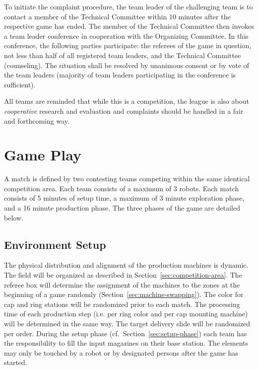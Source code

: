 \documentclass[12pt,twoside]{article}
\newcommand{\refsec}[1]{Section~\ref{#1}}
\begin{document}
To initiate the complaint procedure, the team leader of the
challenging team is to contact a member of the Technical Committee
within 10 minutes after the respective game has ended. The member of
the Technical Committee then invokes a team leader conference in
cooperation with the Organizing Committee. In this conference, the
following parties participate: the referees of the game in question,
not less than half of all registered team leaders, and the Technical
Committee (counseling). The situation shall be resolved by unanimous
consent or by vote of the team leaders (majority of team leaders
participating in the conference is sufficient).

All teams are reminded that while this is a competition, the league is
also about \emph{cooperative} research and evaluation and complaints
should be handled in a fair and forthcoming way.

\section{Game Play}
A match is defined by two contesting teams competing within the same
identical competition area. Each team consists of a maximum of 3
robots. Each match consists of 5 minutes of setup time, a maximum of 3
minute exploration phase, and a 16 minute production phase.
The three phases of the game are detailed below.

\subsection{Environment Setup}
\label{sec:env-setup}
The physical distribution and alignment of the production machines is
dynamic. The field will be organized as described in
\refsec{sec:competition-area}. The referee box will determine the
assignment of the machines to the zones at the beginning of a game
randomly (\refsec{sec:machine-swapping}).
The color for cap and ring stations will be
randomized prior to each match. The processing time of each production
step (i.e. per ring color and per cap mounting machine) will be
determined in the same way. The target delivery slide will be
randomized per order. During the setup phase
(cf.~\refsec{sec:setup-phase}) each team has the responsibility to
fill the input magazines on their base station. The elements may only
be touched by a robot or by designated persons after the game has
started.

\end{document}
